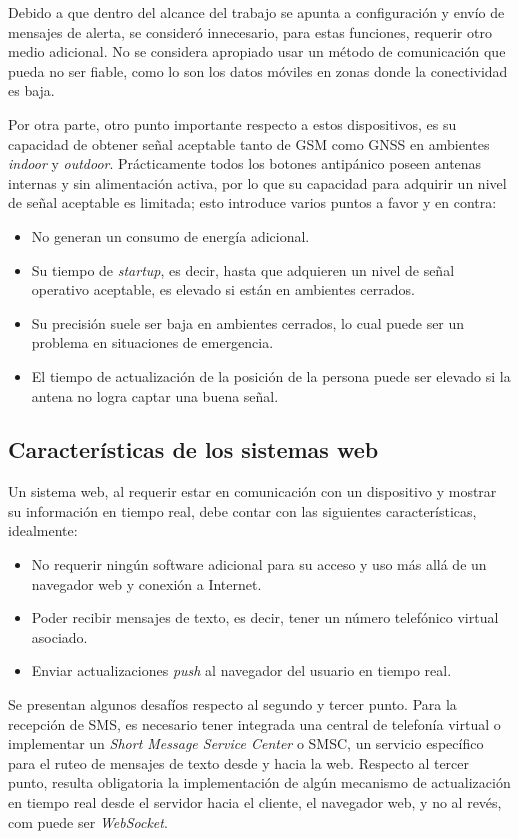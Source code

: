Debido a que dentro del alcance del trabajo se apunta a configuración y envío de mensajes de alerta, se consideró innecesario, para estas funciones, requerir otro medio adicional. No se considera apropiado usar un método de comunicación que pueda no ser fiable, como lo son los datos móviles en zonas donde la conectividad es baja.

Por otra parte, otro punto importante respecto a estos dispositivos, es su capacidad de obtener señal aceptable tanto de GSM como GNSS en ambientes \textit{indoor} y \textit{outdoor}. Prácticamente todos los botones antipánico poseen antenas internas y sin alimentación activa, por lo que su capacidad para adquirir un nivel de señal aceptable es limitada; esto introduce varios puntos a favor y en contra:
\begin{itemize}
	\item No generan un consumo de energía adicional.
	\item Su tiempo de \textit{startup}, es decir, hasta que adquieren un nivel de señal operativo aceptable, es elevado si están en ambientes cerrados.
	\item Su precisión suele ser baja en ambientes cerrados, lo cual puede ser un problema en situaciones de emergencia.
	\item El tiempo de actualización de la posición de la persona puede ser elevado si la antena no logra captar una buena señal.
\end{itemize}

\subsection{Características de los sistemas web}

Un sistema web, al requerir estar en comunicación con un dispositivo y mostrar su información en tiempo real, debe contar con las siguientes características, idealmente:
\begin{itemize}
	\item No requerir ningún software adicional para su acceso y uso más allá de un navegador web y conexión a Internet.
	\item Poder recibir mensajes de texto, es decir, tener un número telefónico virtual asociado.
	\item Enviar actualizaciones \textit{push} al navegador del usuario en tiempo real.
\end{itemize}

Se presentan algunos desafíos respecto al segundo y tercer punto. Para la recepción de SMS, es necesario tener integrada una central de telefonía virtual o implementar un \textit{Short Message Service Center} o SMSC, un servicio específico para el ruteo de mensajes de texto desde y hacia la web. Respecto al tercer punto, resulta obligatoria la implementación de algún mecanismo de actualización en tiempo real desde el servidor hacia el cliente, el navegador web, y no al revés, com puede ser \textit{WebSocket}.


